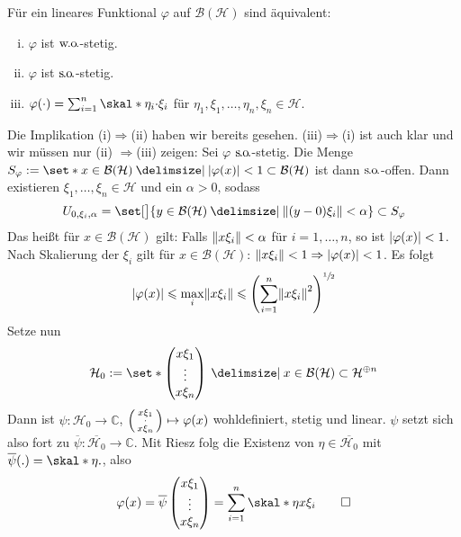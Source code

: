 \begin{satz}[label=satz:619,{name=[für Funktionale ist wo-stetig äquivalent zu so-stetig]}]
	Für ein lineares Funktional $\varphi$ auf $\mathcal{B}(\mathcal{H})$ sind äquivalent:
	\begin{enumerate}[(i)]
		\item $\varphi$ ist $\wo$-stetig.
		\item $\varphi$ ist $\so$-stetig.
		\item $\varphi(\cdot)=\sum_{i=1}^{n} \skal*{\eta_i}{\cdot \xi_i} $ für $\eta_1,\xi_1, \ldots , \eta_n, \xi_n \in \mathcal{H}$.
	\end{enumerate}
\end{satz}
\begin{beweis}
	Die Implikation (i)$\Rightarrow$(ii) haben wir bereits gesehen.
	(iii)$\Rightarrow$(i) ist auch klar und wir müssen nur (ii) $\Rightarrow$(iii) zeigen:
	Sei $\varphi$ $\so$-stetig. Die Menge $S_\varphi := \set*{x \in \mathcal{B}(\mathcal{H}) \given \abs*{\varphi(x)}<1} \subset \mathcal{B}(\mathcal{H})$ ist dann $\so$-offen.
	Dann existieren $\xi_1, \ldots ,\xi_n \in \mathcal{H}$ und ein $\alpha>0$, sodass 
	\[
		U_{0,\xi_i,\alpha}= \set[\big]{y \in \mathcal{B}(\mathcal{H}) \given \norm*{(y-0)\xi_i}< \alpha}  \subset S_\varphi
	\]
	Das heißt für $x \in \mathcal{B}(\mathcal{H})$ gilt: Falls $\norm*{x \xi_i}<\alpha$ für $i=1,\ldots ,n$, so ist $\abs*{\varphi(x)}<1$.
	Nach Skalierung der $\xi_i$ gilt für $x \in \mathcal{B}(\mathcal{H})$:
	\(
		\norm*{x \xi_i} < 1 \Rightarrow \abs*{\varphi(x)}<1 
	\).
	Es folgt 
	\[
		\abs*{\varphi(x)} \le \max_i \norm*{x \xi_i} \le \enbrace*{\sum_{i=1}^{n} \norm*{x \xi_i}^2}^{\sfrac{1}{2}}
	\]
	Setze nun 
	\[
		\mathcal{H}_0 := \set*{\begin{pmatrix}
			x \xi_1 \\ \vdots \\ x \xi_n
		\end{pmatrix} \given x \in \mathcal{B}(\mathcal{H})} \subset \mathcal{H}^{\oplus n}
	\]
	Dann ist $\psi \colon \mathcal{H}_0 \to \mathbb{C}$, $\begin{psmallmatrix}
		x \xi_1 \\ \cdot \\ x \xi_n
	\end{psmallmatrix} \mapsto \varphi(x)$ wohldefiniert, stetig und linear.
	$\psi$ setzt sich also fort zu $\overline{\psi} \colon \overline{\mathcal{H}_0} \to \mathbb{C}$.
	Mit Riesz folg die Existenz von $\eta \in \overline{\mathcal{H}_0}$ mit $\overline{\psi}(.) = \skal*{\eta}{.}$, also
	\[
		\varphi(x) = \overline{\psi} \begin{pmatrix}
			x \xi_1 \\ \vdots \\ x \xi_n
		\end{pmatrix} = \sum_{i=1}^{n} \skal*{\eta}{x \xi_i} \qedhere
	\]
\end{beweis}


